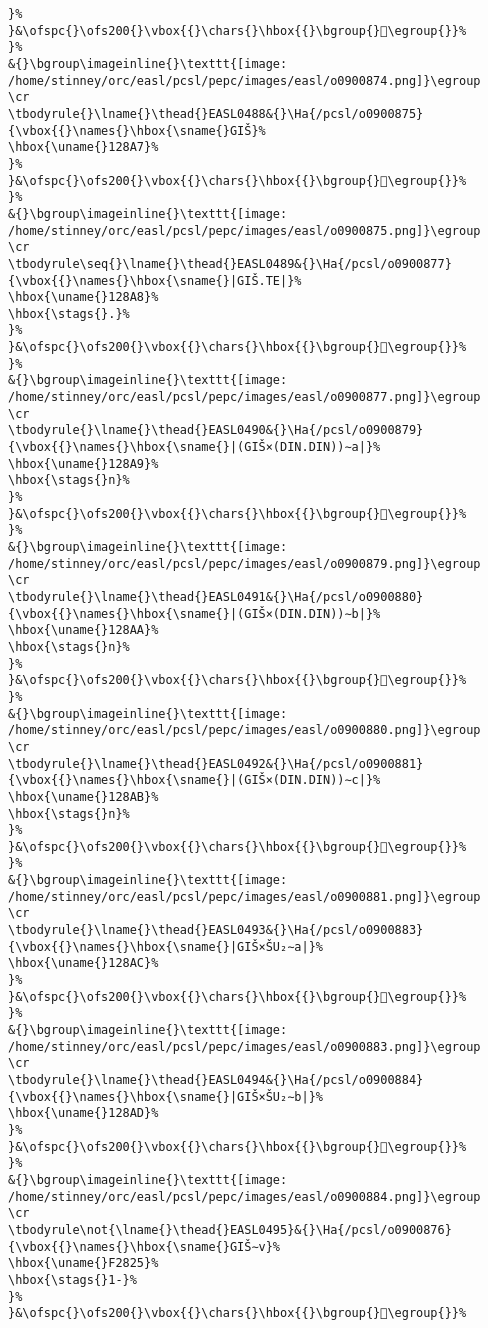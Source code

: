 \begin{verbatim}
}%
}&\ofspc{}\ofs200{}\vbox{{}\chars{}\hbox{{}\bgroup{}𒢦\egroup{}}%
}%
&{}\bgroup\imageinline{}\texttt{[image: /home/stinney/orc/easl/pcsl/pepc/images/easl/o0900874.png]}\egroup
\cr
\tbodyrule{}\lname{}\thead{}EASL0488&{}\Ha{/pcsl/o0900875}{\vbox{{}\names{}\hbox{\sname{}GIŠ}%
\hbox{\uname{}128A7}%
}%
}&\ofspc{}\ofs200{}\vbox{{}\chars{}\hbox{{}\bgroup{}𒢧\egroup{}}%
}%
&{}\bgroup\imageinline{}\texttt{[image: /home/stinney/orc/easl/pcsl/pepc/images/easl/o0900875.png]}\egroup
\cr
\tbodyrule\seq{}\lname{}\thead{}EASL0489&{}\Ha{/pcsl/o0900877}{\vbox{{}\names{}\hbox{\sname{}|GIŠ.TE|}%
\hbox{\uname{}128A8}%
\hbox{\stags{}.}%
}%
}&\ofspc{}\ofs200{}\vbox{{}\chars{}\hbox{{}\bgroup{}𒢨\egroup{}}%
}%
&{}\bgroup\imageinline{}\texttt{[image: /home/stinney/orc/easl/pcsl/pepc/images/easl/o0900877.png]}\egroup
\cr
\tbodyrule{}\lname{}\thead{}EASL0490&{}\Ha{/pcsl/o0900879}{\vbox{{}\names{}\hbox{\sname{}|(GIŠ×(DIN.DIN))∼a|}%
\hbox{\uname{}128A9}%
\hbox{\stags{}n}%
}%
}&\ofspc{}\ofs200{}\vbox{{}\chars{}\hbox{{}\bgroup{}𒢩\egroup{}}%
}%
&{}\bgroup\imageinline{}\texttt{[image: /home/stinney/orc/easl/pcsl/pepc/images/easl/o0900879.png]}\egroup
\cr
\tbodyrule{}\lname{}\thead{}EASL0491&{}\Ha{/pcsl/o0900880}{\vbox{{}\names{}\hbox{\sname{}|(GIŠ×(DIN.DIN))∼b|}%
\hbox{\uname{}128AA}%
\hbox{\stags{}n}%
}%
}&\ofspc{}\ofs200{}\vbox{{}\chars{}\hbox{{}\bgroup{}𒢪\egroup{}}%
}%
&{}\bgroup\imageinline{}\texttt{[image: /home/stinney/orc/easl/pcsl/pepc/images/easl/o0900880.png]}\egroup
\cr
\tbodyrule{}\lname{}\thead{}EASL0492&{}\Ha{/pcsl/o0900881}{\vbox{{}\names{}\hbox{\sname{}|(GIŠ×(DIN.DIN))∼c|}%
\hbox{\uname{}128AB}%
\hbox{\stags{}n}%
}%
}&\ofspc{}\ofs200{}\vbox{{}\chars{}\hbox{{}\bgroup{}𒢫\egroup{}}%
}%
&{}\bgroup\imageinline{}\texttt{[image: /home/stinney/orc/easl/pcsl/pepc/images/easl/o0900881.png]}\egroup
\cr
\tbodyrule{}\lname{}\thead{}EASL0493&{}\Ha{/pcsl/o0900883}{\vbox{{}\names{}\hbox{\sname{}|GIŠ×ŠU₂∼a|}%
\hbox{\uname{}128AC}%
}%
}&\ofspc{}\ofs200{}\vbox{{}\chars{}\hbox{{}\bgroup{}𒢬\egroup{}}%
}%
&{}\bgroup\imageinline{}\texttt{[image: /home/stinney/orc/easl/pcsl/pepc/images/easl/o0900883.png]}\egroup
\cr
\tbodyrule{}\lname{}\thead{}EASL0494&{}\Ha{/pcsl/o0900884}{\vbox{{}\names{}\hbox{\sname{}|GIŠ×ŠU₂∼b|}%
\hbox{\uname{}128AD}%
}%
}&\ofspc{}\ofs200{}\vbox{{}\chars{}\hbox{{}\bgroup{}𒢭\egroup{}}%
}%
&{}\bgroup\imageinline{}\texttt{[image: /home/stinney/orc/easl/pcsl/pepc/images/easl/o0900884.png]}\egroup
\cr
\tbodyrule\not{\lname{}\thead{}EASL0495}&{}\Ha{/pcsl/o0900876}{\vbox{{}\names{}\hbox{\sname{}GIŠ∼v}%
\hbox{\uname{}F2825}%
\hbox{\stags{}1-}%
}%
}&\ofspc{}\ofs200{}\vbox{{}\chars{}\hbox{{}\bgroup{}󲠥\egroup{}}%

\end{verbatim}
